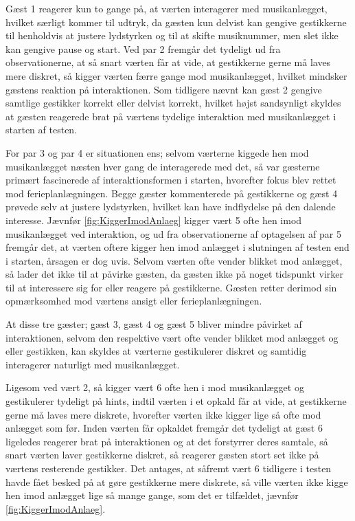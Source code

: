 Gæst 1 reagerer kun to gange på, at værten interagerer med musikanlægget, hvilket særligt kommer til udtryk, da gæsten kun delvist kan gengive gestikkerne til henholdvis at justere lydstyrken og til at skifte musiknummer, men slet ikke kan gengive pause og start. Ved par 2 fremgår det tydeligt ud fra observationerne, at så snart værten får at vide, at gestikkerne gerne må laves mere diskret, så kigger værten færre gange mod musikanlægget, hvilket mindsker gæstens reaktion på interaktionen. Som tidligere nævnt kan gæst 2 gengive samtlige gestikker korrekt eller delvist korrekt, hvilket højst sandsynligt skyldes at gæsten reagerede brat på værtens tydelige interaktion med musikanlægget i starten af testen. 

For par 3 og par 4 er situationen ens; selvom værterne kiggede hen mod musikanlægget næsten hver gang de interagerede med det, så var gæsterne primært fascinerede af interaktionsformen i starten, hvorefter fokus blev rettet mod ferieplanlægningen. Begge gæster kommenterede på gestikkerne og gæst 4 prøvede selv at justere lydstyrken, hvilket kan have indflydelse på den dalende interesse. Jævnfør \autoref{fig:KiggerImodAnlaeg} kigger vært 5 ofte hen imod musikanlægget ved interaktion, og ud fra observationerne af optagelsen af par 5 fremgår det, at værten oftere kigger hen imod anlægget i slutningen af testen end i starten, årsagen er dog uvis. Selvom værten ofte vender blikket mod anlægget, så lader det ikke til at påvirke gæsten, da gæsten ikke på noget tidspunkt virker til at interessere sig for eller reagere på gestikkerne. Gæsten retter derimod sin opmærksomhed mod værtens ansigt eller ferieplanlægningen. 

At disse tre gæster; gæst 3, gæst 4 og gæst 5 bliver mindre påvirket af interaktionen, selvom den respektive vært ofte vender blikket mod anlægget og eller gestikken, kan skyldes at værterne gestikulerer diskret og samtidig interagerer naturligt med musikanlægget.

Ligesom ved vært 2, så kigger vært 6 ofte hen i mod musikanlægget og gestikulerer tydeligt på hints, indtil værten i et opkald får at vide, at gestikkerne gerne må laves mere diskrete, hvorefter værten ikke kigger lige så ofte mod anlægget som før. Inden værten får opkaldet fremgår det tydeligt at gæst 6 ligeledes reagerer brat på interaktionen og at det forstyrrer deres samtale, så snart værten laver gestikkerne diskret, så reagerer gæsten stort set ikke på værtens resterende gestikker. Det antages, at såfremt vært 6 tidligere i testen havde fået besked på at gøre gestikkerne mere diskrete, så ville værten ikke kigge hen imod anlægget lige så mange gange, som det er tilfældet, jævnfør \autoref{fig:KiggerImodAnlaeg}. 

